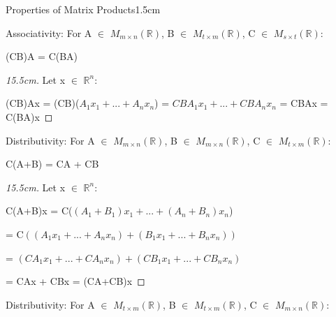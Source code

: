     \begin{ltheorem}{Properties of Matrix Products}{1.5cm}
        \item {\color{lgreen} Associativity}:
            For A $\in$ $M_{m \times n}(\mathbb{R})$,
            B $\in$ $M_{t \times m}(\mathbb{R})$,
            C $\in$ $M_{s \times t}(\mathbb{R})$:

            \hspace{0.5cm}
            (CB)A = C(BA)

            \begin{proof}[15.5cm]
                Let x $\in$ $\mathbb{R}^n$:

                \hspace{0.5cm}
                (CB)Ax
                = (CB)($A_1x_1 + ... + A_nx_n$)
                = $CBA_1x_1 + ... + CBA_nx_n$
                = CBAx
                = C(BA)x
            \end{proof}

        \item {\color{lgreen} Distributivity}:
            For A $\in$ $M_{m \times n}(\mathbb{R})$,
            B $\in$ $M_{m \times n}(\mathbb{R})$,
            C $\in$ $M_{t \times m}(\mathbb{R})$:

            \hspace{0.5cm}
            C(A+B) = CA + CB

            \begin{proof}[15.5cm]
                Let x $\in$ $\mathbb{R}^n$:

                \hspace{0.5cm}
                C(A+B)x
                = C($(A_1+B_1)x_1 + ... + (A_n+B_n)x_n$)
                
                \hspace{2.4cm}
                = C$((A_1x_1 + ... + A_nx_n) + (B_1x_1 + ... + B_nx_n))$

                \hspace{2.4cm}
                = $(CA_1x_1 + ... + CA_nx_n) + (CB_1x_1 + ... + CB_nx_n)$

                \hspace{2.4cm}
                = CAx + CBx
                = (CA+CB)x
            \end{proof}

        \item {\color{lgreen} Distributivity}:
            For A $\in$ $M_{t \times m}(\mathbb{R})$,
            B $\in$ $M_{t \times m}(\mathbb{R})$,
            C $\in$ $M_{m \times n}(\mathbb{R})$:


\end{ltheorem}
